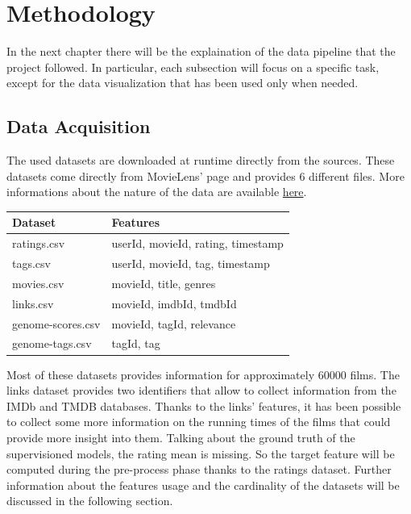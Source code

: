 \documentclass[../main]{subfiles}
\begin{document}
\chapter{Methodology}
In the next chapter there will be the explaination of the data pipeline that the project followed.
In particular, each subsection will focus on a specific task, except for the data visualization that has been used only when needed.

\section{Data Acquisition}
The used datasets are downloaded at runtime directly from the sources.
These datasets come directly from MovieLens' page and provides 6 different files.
More informations about the nature of the data are available \href{https://files.grouplens.org/datasets/movielens/ml-latest-README.html}{here}.
    \begin{table}[h]
        \center
        \begin{tabular}{|l | l|}
        \hline
        \textbf{Dataset} & \textbf{Features} \\
        \hline
        ratings.csv &  userId, movieId, rating, timestamp\\
        \hline
        tags.csv &  userId, movieId, tag, timestamp\\
        \hline
        movies.csv &  movieId, title, genres\\
        \hline
        links.csv &  movieId, imdbId, tmdbId\\
        \hline
        genome-scores.csv &  movieId, tagId, relevance\\
        \hline
        genome-tags.csv & tagId, tag\\
        \hline
        \end{tabular}
    \end{table}
        


Most of these datasets provides information for approximately 60000 films.
The links dataset provides two identifiers that allow to collect information from the IMDb and TMDB databases.
Thanks to the links' features, it has been possible to collect some more information on the running times of the films that could provide more insight into them.
Talking about the ground truth of the supervisioned models, the rating mean is missing. So the target feature will be computed during the pre-process phase thanks to the ratings dataset.
Further information about the features usage and the cardinality of the datasets will be discussed in the following section.
\end{document}
